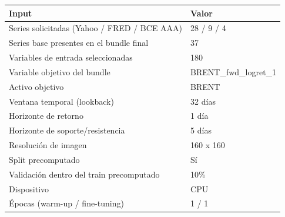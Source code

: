 \begin{tabular}{p{}p{}}
\toprule
                                      Input &              Valor \\
\midrule
Series solicitadas (Yahoo / FRED / BCE AAA) &         28 / 9 / 4 \\
   Series base presentes en el bundle final &                 37 \\
         Variables de entrada seleccionadas &                180 \\
               Variable objetivo del bundle & BRENT\_fwd\_logret\_1 \\
                            Activo objetivo &              BRENT \\
                Ventana temporal (lookback) &            32 días \\
                       Horizonte de retorno &              1 día \\
           Horizonte de soporte/resistencia &             5 días \\
                       Resolución de imagen &          160 x 160 \\
                         Split precomputado &                 Sí \\
   Validación dentro del train precomputado &                10\% \\
                                Dispositivo &                CPU \\
             Épocas (warm-up / fine-tuning) &              1 / 1 \\
\bottomrule
\end{tabular}
